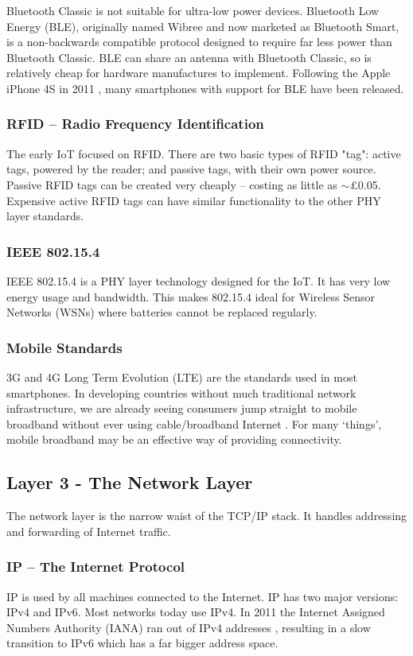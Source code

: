 \documentclass[10pt,journal,compsoc]{IEEEtran}
\begin{document}
Bluetooth Classic is not suitable for ultra-low power devices. Bluetooth Low
Energy (BLE), originally named Wibree and now marketed as Bluetooth Smart, is a
non-backwards compatible protocol designed to require far less power than
Bluetooth Classic. BLE can share an antenna with Bluetooth Classic, so is
relatively cheap for hardware manufactures to implement. Following the Apple
iPhone 4S in 2011 \cite{Engadget2011}, many smartphones with support for BLE
have been released.

\subsubsection{RFID -- Radio Frequency Identification}
The early IoT focused on RFID. There are two basic types of RFID "tag": active
tags, powered by the reader; and passive tags, with their own power source.
Passive RFID tags can be created very cheaply -- costing as little as
$\sim$\pounds0.05.  Expensive active RFID tags can have similar functionality
to the other PHY layer standards. 

\subsubsection{IEEE 802.15.4}
IEEE 802.15.4 is a PHY layer technology designed for the IoT. It has very low
energy usage and bandwidth. This makes 802.15.4 ideal for Wireless Sensor
Networks (WSNs) where batteries cannot be replaced regularly. 

\subsubsection{Mobile Standards}
3G and 4G Long Term Evolution (LTE) are the standards used in most smartphones.
In developing countries without much traditional network infrastructure, we are
already seeing consumers jump straight to mobile broadband without ever using
cable/broadband Internet \cite{Kritzinger2013}. For many `things', mobile
broadband may be an effective way of providing connectivity.  

\subsection{Layer 3 - The Network Layer}
The network layer is the narrow waist of the TCP/IP stack. It handles
addressing and forwarding of Internet traffic. 

\subsubsection{IP -- The Internet Protocol}
IP is used by all machines connected to the Internet. IP has two major
versions: IPv4 and IPv6. Most networks today use IPv4. In 2011 the Internet
Assigned Numbers Authority (IANA) ran out of IPv4 addresses \cite{Potaroo},
resulting in a slow transition to IPv6 which has a far bigger address space.
\end{document}
